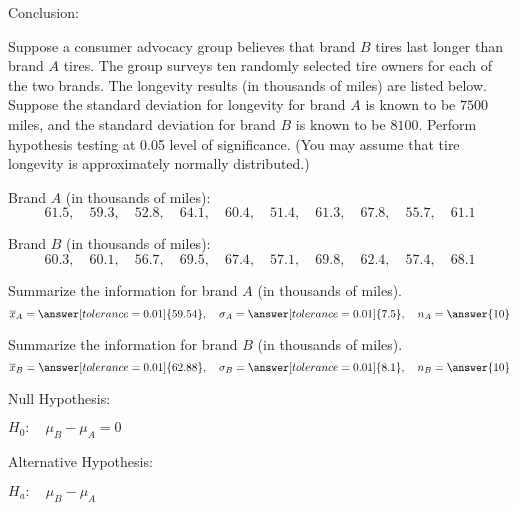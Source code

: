 \documentclass{ximera}
\begin{document}
\begin{problem}
Conclusion:

\begin{multipleChoice} 
\end{multipleChoice} 
\end{problem}

\begin{problem}\label{prob:140quiz12prob2}
Suppose a consumer advocacy group believes that brand $B$ tires last longer than brand $A$ tires.  The group surveys ten randomly selected tire owners for each of the two brands.  The longevity results (in thousands of miles) are listed below.  Suppose the standard deviation for longevity for brand $A$ is known to be $7500$ miles, and the standard deviation for brand $B$ is known to be $8100$.  Perform hypothesis testing at 0.05 level of significance. (You may assume that tire longevity is approximately normally distributed.)

Brand $A$ (in thousands of miles): $$61.5,\quad 59.3,\quad 52.8,\quad 64.1,\quad 60.4,\quad 51.4,\quad 61.3,\quad 67.8,\quad 55.7,\quad 61.1$$

Brand $B$ (in thousands of miles): $$60.3,\quad 60.1, \quad 56.7,\quad 69.5, \quad 67.4,\quad 57.1,\quad 69.8,\quad 62.4,\quad 57.4,\quad 68.1$$

Summarize the information for brand $A$ (in thousands of miles).
$$\overline{x}_A=\answer[tolerance=0.01]{59.54},\quad \sigma_A=\answer[tolerance=0.01]{7.5},\quad n_A=\answer{10}$$

Summarize the information for brand $B$ (in thousands of miles).
$$\overline{x}_B=\answer[tolerance=0.01]{62.88},\quad \sigma_B=\answer[tolerance=0.01]{8.1},\quad n_B=\answer{10}$$

Null Hypothesis:

$H_0:\quad \mu_B-\mu_A=0$ 

Alternative Hypothesis:

$H_a:\quad \mu_B-\mu_A$ 


\end{problem}
\end{document}
